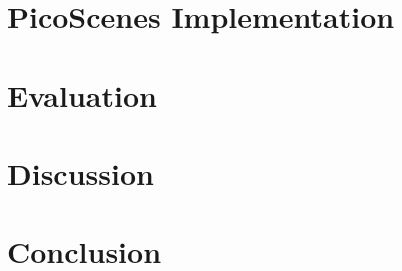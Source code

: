 \documentclass{sig-alternate-10pt}
\begin{document}
\section{PicoScenes Implementation} %
\label{sec:picoscenes_implementation}


\section{Evaluation} %
\label{sec:evaluation}


\section{Discussion} %
\label{sec:discussion}


\section{Conclusion} %
\label{sec:conclusion}


{{\small


}}
\end{document}
